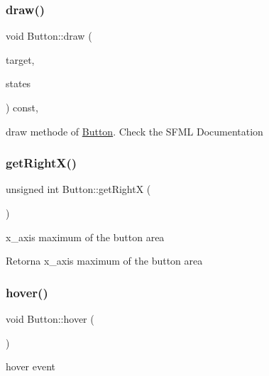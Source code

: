 \subsubsection{\texorpdfstring{draw()}{draw()}}
{\footnotesize\ttfamily void Button\+::draw (\begin{DoxyParamCaption}\item[{sf\+::\+Render\+Target \&}]{target,  }\item[{sf\+::\+Render\+States}]{states }\end{DoxyParamCaption}) const\hspace{0.3cm}{\ttfamily [private]}, {\ttfamily [virtual]}}



draw methode of \hyperlink{classButton}{Button}. Check the S\+F\+ML Documentation 

\mbox{\label{classButton_a1bc1735913f9fa01531f10c2a30f0202}} 
\subsubsection{\texorpdfstring{get\+Right\+X()}{getRightX()}}
{\footnotesize\ttfamily unsigned int Button\+::get\+RightX (\begin{DoxyParamCaption}{ }\end{DoxyParamCaption})}



x\+\_\+axis maximum of the button area 

\begin{DoxyReturn}{Retorna}
x\+\_\+axis maximum of the button area 
\end{DoxyReturn}
\mbox{\label{classButton_a1a5ca19ed8efe0ea27625217dcab9f2c}} 
\subsubsection{\texorpdfstring{hover()}{hover()}}
{\footnotesize\ttfamily void Button\+::hover (\begin{DoxyParamCaption}{ }\end{DoxyParamCaption})\hspace{0.3cm}{\ttfamily [private]}}



hover event 


